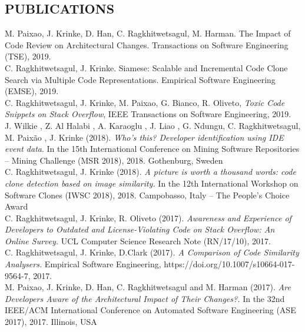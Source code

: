 \documentclass[margin, 10pt]{res} %
\begin{document}
\begin{resume}

\section{PUBLICATIONS}  

M. Paixao, J. Krinke, D. Han, C. Ragkhitwetsagul, M. Harman. The Impact of Code Review on Architectural Changes. Transactions on Software Engineering (TSE), 2019.
\vspace{2mm} \\
C. Ragkhitwetsagul, J. Krinke. Siamese: Scalable and Incremental Code Clone Search via Multiple Code Representations. Empirical Software Engineering (EMSE), 2019. 
\vspace{2mm} \\
C. Ragkhitwetsagul, J. Krinke, M. Paixao, G. Bianco, R. Oliveto, \textit{Toxic Code Snippets on Stack Overflow}, IEEE Transactions on Software Engineering, 2019.
\vspace{2mm} \\
J. Wilkie , Z. Al Halabi , A. Karaoglu , J. Liao , G. Ndungu, C. Ragkhitwetsagul, M. Paixão , J. Krinke (2018). \textit{Who's this? Developer identification using IDE event data}. In the 15th International Conference on Mining Software Repositories -- Mining Challenge (MSR 2018), 2018. Gothenburg, Sweden 
\vspace{2mm} \\
C. Ragkhitwetsagul, J. Krinke (2018). \textit{A picture is worth a thousand words: code clone detection based on image similarity.} In the 12th International Workshop on Software Clones (IWSC 2018), 2018. Campobasso, Italy -- The People's Choice Award\vspace{2mm} \\
C. Ragkhitwetsagul, J. Krinke, R. Oliveto (2017). \textit{Awareness and Experience of Developers to Outdated and License-Violating Code on Stack Overflow: An Online Survey.} UCL Computer Science Research Note (RN/17/10), 2017. \vspace{2mm} \\
C. Ragkhitwetsagul, J. Krinke, D.Clark (2017). \textit{A Comparison of Code Similarity Analysers.} Empirical Software Engineering, https://doi.org/10.1007/s10664-017-9564-7, 2017. \vspace{2mm} \\
M. Paixao, J. Krinke, D. Han, C. Ragkhitwetsagul and M. Harman (2017). \textit{Are Developers Aware of the Architectural Impact of Their Changes?.} In the 32nd IEEE/ACM International Conference on Automated Software Engineering (ASE 2017), 2017. Illinois, USA \vspace{2mm} \\

\end{resume}
\end{document}
